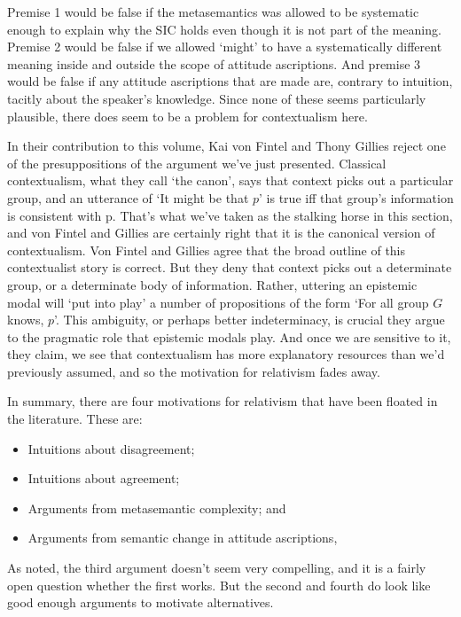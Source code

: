 \noindent Premise 1 would be false if the metasemantics was allowed to be systematic enough to explain why the SIC holds even though it is not part of the meaning. Premise 2 would be false if we allowed `might' to have a systematically different meaning inside and outside the scope of attitude ascriptions. And premise 3 would be false if any attitude ascriptions that are made are, contrary to intuition, tacitly about the speaker's knowledge. Since none of these seems particularly plausible, there does seem to be a problem for contextualism here.

In their contribution to this volume, Kai von Fintel and Thony Gillies reject one of the presuppositions of the argument we've just presented. Classical contextualism, what they call `the canon', says that context picks out a particular group, and an utterance of `It might be that $p$' is true iff that group's information is consistent with p. That's what we've taken as the stalking horse in this section, and von Fintel and Gillies are certainly right that it is the canonical version of contextualism. Von Fintel and Gillies agree that the broad outline of this contextualist story is correct. But they deny that context picks out a determinate group, or a determinate body of information. Rather, uttering an epistemic modal will `put into play' a number of propositions of the form `For all group $G$ knows, $p$'. This ambiguity, or perhaps better indeterminacy, is crucial they argue to the pragmatic role that epistemic modals play. And once we are sensitive to it, they claim, we see that contextualism has more explanatory resources than we'd previously assumed, and so the motivation for relativism fades away.

In summary, there are four motivations for relativism that have been floated in the literature. These are:

\begin{itemize}
\item Intuitions about disagreement;
\item Intuitions about agreement;
\item Arguments from metasemantic complexity; and
\item Arguments from semantic change in attitude ascriptions,
\end{itemize}

\noindent As noted, the third argument doesn't seem very compelling, and it is a fairly open question whether the first works. But the second and fourth do look like good enough arguments to motivate alternatives.


